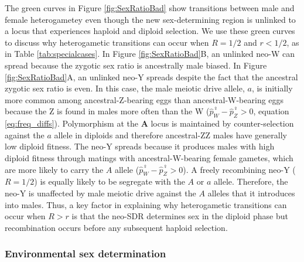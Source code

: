 \documentclass[12pt]{article}
\begin{document}
The green curves in Figure \ref{fig:SexRatioBad} show transitions between male and female heterogametey even though the new sex-determining region is unlinked to a locus that experiences haploid and diploid selection. 
We use these green curves to discuss why heterogametic transitions can occur when $R=1/2$ and $r<1/2$, as in Table \ref{tab:specialcases}.
In Figure \ref{fig:SexRatioBad}B, an unlinked neo-W can spread because the zygotic sex ratio is ancestrally male biased. 
In Figure \ref{fig:SexRatioBad}A, an unlinked neo-Y spreads despite the fact that the ancestral zygotic sex ratio is even. 
In this case, the male meiotic drive allele, $a$, is initially more common among ancestral-Z-bearing eggs than ancestral-W-bearing eggs because the Z is found in males more often than the W ($\hat{p}_{W}^\female-\hat{p}_{Z}^\female>0$, equation \ref{eq:freq_diffs}). 
Polymorphism at the \textbf{A} locus is maintained by counter-selection against the $a$ allele in diploids and therefore ancestral-ZZ males have generally low diploid fitness. 
The neo-Y spreads because it produces males with high diploid fitness through matings with ancestral-W-bearing female gametes, which are more likely to carry the $A$ allele ($\hat{p}_{W}^\female-\hat{p}_{Z}^\female>0$). 
A freely recombining neo-Y ($R=1/2$) is equally likely to be segregate with the $A$ or $a$ allele.
Therefore, the neo-Y is unaffected by male meiotic drive against the $A$ alleles that it introduces into males. 
Thus, a key factor in explaining why heterogametic transitions can occur when $R>r$ is that the neo-SDR determines sex in the diploid phase but recombination occurs before any subsequent haploid selection. 


\subsubsection*{Environmental sex determination}
\end{document}
